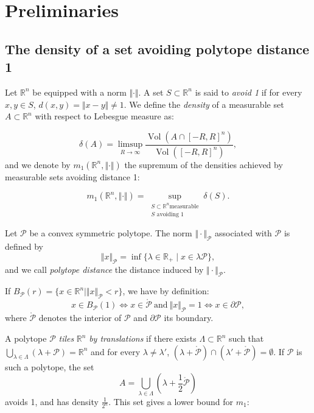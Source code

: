 \documentclass{amsart}                     %
\newcommand{\R}{{\mathbb R}}
\newcommand{\Vol}{\operatorname{Vol}}
\begin{document}
\section{Preliminaries}\label{prelims}

\subsection{The density of a set avoiding polytope distance 1}\label{prelimDP}

Let $\R^n$ be equipped with a norm $\Vert   \cdot \Vert  $.  A set $S\subset \R^n$ is said to \textit{avoid 1} if for every $x,y\in S$, $d(x,y)=\Vert   x-y \Vert  \neq 1$. We define the \textit{density} of a measurable set $A\subset \R^n$ with respect to Lebesgue measure as: 

$$\delta(A)=\limsup_{R\to\infty} \frac{\Vol(A\cap [-R,R]^n)}{\Vol([-R,R]^n)},$$
 and we denote by $m_1(\R^n,\Vert   \cdot\Vert  )$ the supremum of the densities achieved by measurable sets avoiding distance 1:

$$m_1(\R^n,\Vert   \cdot\Vert  )=\sup_{ \substack{ S\subset \R^n \text{measurable} \\ S \text{ avoiding } 1}}  \delta(S).$$

Let $\mathcal{P}$ be a convex symmetric polytope. The norm $\Vert   \cdot\Vert  _\mathcal{P}$ associated with $\mathcal{P}$ is defined by
$$\Vert   x\Vert  _\mathcal{P}=\inf\{ \lambda \in \R_+\mid   x \in \lambda \mathcal{P} \},$$
and we call \textit{polytope distance} the distance induced by $\Vert \cdot \Vert_\mathcal{P}$.

If $B_\mathcal{P}(r)=\{ x\in\R^n\mid \Vert  x\Vert  _\mathcal{P}<r\}$, we have by definition:
$$x\in B_\mathcal{P}(1) \Leftrightarrow x \in \mathring{\mathcal{P}}\  \text{and}\ \Vert  x\Vert  _\mathcal{P}=1 \Leftrightarrow x \in \partial\mathcal{P},  $$
where $\mathring{\mathcal{P}}$ denotes the interior of $\mathcal{P}$ and $\partial\mathcal{P}$ its boundary.


A polytope $\mathcal{P}$ \textit{tiles} $\R^n$ \textit{by translations} if there exists $\Lambda\subset \R^n$ such that ${\bigcup_{\lambda \in \Lambda} (\lambda + \mathcal{P}) =\R^n}$ and for every $\lambda \neq \lambda '$,  $(\lambda + \mathring{\mathcal{P}} ) \cap (\lambda' + \mathring{\mathcal{P}}) = \emptyset$. 
If $\mathcal{P}$ is such a polytope, the set 
$$A=\bigcup_{\lambda \in \Lambda} (\lambda + \frac{1}{2}\mathring{\mathcal{P}})$$
avoids 1, and has density $\frac{1}{2^n}$. This set gives a lower bound for $m_1$:
\end{document}
